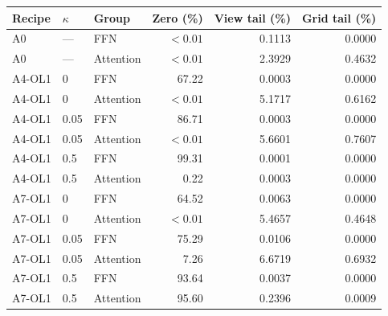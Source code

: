 \begin{tabular}{@{}lllrrr@{}}
\toprule
Recipe & $\kappa$ & Group & Zero (\%) & View tail (\%) & Grid tail (\%) \\
\midrule
A0 & --- & FFN & $<0.01$ & 0.1113 & 0.0000 \\
A0 & --- & Attention & $<0.01$ & 2.3929 & 0.4632 \\
A4-OL1 & 0 & FFN & 67.22 & 0.0003 & 0.0000 \\
A4-OL1 & 0 & Attention & $<0.01$ & 5.1717 & 0.6162 \\
A4-OL1 & 0.05 & FFN & 86.71 & 0.0003 & 0.0000 \\
A4-OL1 & 0.05 & Attention & $<0.01$ & 5.6601 & 0.7607 \\
A4-OL1 & 0.5 & FFN & 99.31 & 0.0001 & 0.0000 \\
A4-OL1 & 0.5 & Attention & 0.22 & 0.0003 & 0.0000 \\
A7-OL1 & 0 & FFN & 64.52 & 0.0063 & 0.0000 \\
A7-OL1 & 0 & Attention & $<0.01$ & 5.4657 & 0.4648 \\
A7-OL1 & 0.05 & FFN & 75.29 & 0.0106 & 0.0000 \\
A7-OL1 & 0.05 & Attention & 7.26 & 6.6719 & 0.6932 \\
A7-OL1 & 0.5 & FFN & 93.64 & 0.0037 & 0.0000 \\
A7-OL1 & 0.5 & Attention & 95.60 & 0.2396 & 0.0009 \\
\bottomrule
\end{tabular}
